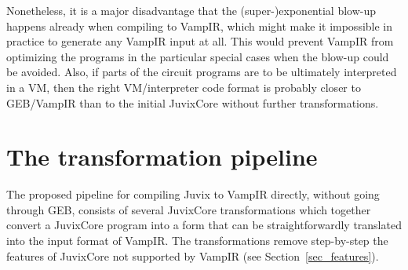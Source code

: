Nonetheless, it is a major disadvantage that the (super-)exponential
blow-up happens already when compiling to VampIR, which might make it
impossible in practice to generate any VampIR input at all. This would
prevent VampIR from optimizing the programs in the particular special
cases when the blow-up could be avoided. Also, if parts of the circuit
programs are to be ultimately interpreted in a VM, then the right
VM/interpreter code format is probably closer to GEB/VampIR than to
the initial JuvixCore without further transformations.

\section{The transformation pipeline}\label{sec_pipeline}

The proposed pipeline for compiling Juvix to VampIR directly, without
going through GEB, consists of several JuvixCore transformations which
together convert a JuvixCore program into a form that can be
straightforwardly translated into the input format of VampIR. The
transformations remove step-by-step the features of JuvixCore not
supported by VampIR (see Section~\ref{sec_features}).
